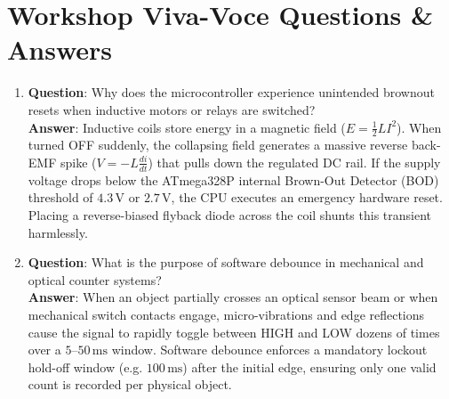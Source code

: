 \section{Workshop Viva-Voce Questions \& Answers}
\begin{enumerate}[leftmargin=1.5em]
    \item \textbf{Question}: Why does the microcontroller experience unintended brownout resets when inductive motors or relays are switched?\\
    \textbf{Answer}: Inductive coils store energy in a magnetic field ($E = \frac{1}{2} L I^2$). When turned OFF suddenly, the collapsing field generates a massive reverse back-EMF spike ($V = -L \frac{di}{dt}$) that pulls down the regulated DC rail. If the supply voltage drops below the ATmega328P internal Brown-Out Detector (BOD) threshold of $4.3\,\mathrm{V}$ or $2.7\,\mathrm{V}$, the CPU executes an emergency hardware reset. Placing a reverse-biased flyback diode across the coil shunts this transient harmlessly.
    \item \textbf{Question}: What is the purpose of software debounce in mechanical and optical counter systems?\\
    \textbf{Answer}: When an object partially crosses an optical sensor beam or when mechanical switch contacts engage, micro-vibrations and edge reflections cause the signal to rapidly toggle between HIGH and LOW dozens of times over a $5\text{--}50\,\mathrm{ms}$ window. Software debounce enforces a mandatory lockout hold-off window (e.g. $100\,\mathrm{ms}$) after the initial edge, ensuring only one valid count is recorded per physical object.
\end{enumerate}
